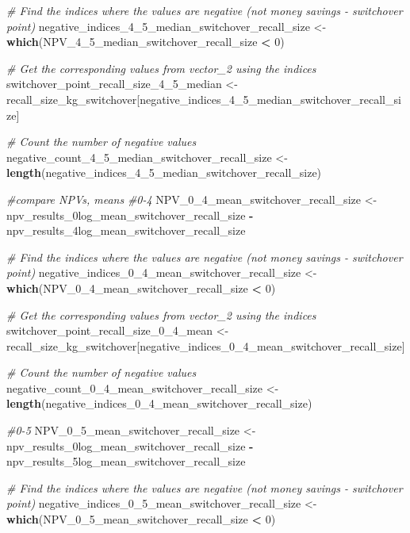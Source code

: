 \documentclass[
]{article}
\newenvironment{Shaded}{\begin{snugshade}}{\end{snugshade}}
\newcommand{\CommentTok}[1]{\textcolor[rgb]{0.56,0.35,0.01}{\textit{#1}}}
\newcommand{\DecValTok}[1]{\textcolor[rgb]{0.00,0.00,0.81}{#1}}
\newcommand{\FunctionTok}[1]{\textcolor[rgb]{0.13,0.29,0.53}{\textbf{#1}}}
\newcommand{\NormalTok}[1]{#1}
\newcommand{\OtherTok}[1]{\textcolor[rgb]{0.56,0.35,0.01}{#1}}
\newcommand{\SpecialCharTok}[1]{\textcolor[rgb]{0.81,0.36,0.00}{\textbf{#1}}}
\begin{document}
\begin{Shaded}
\begin{Highlighting}[]
\CommentTok{\# Find the indices where the values are negative (not money savings {-} switchover point)}
\NormalTok{negative\_indices\_4\_5\_median\_switchover\_recall\_size }\OtherTok{\textless{}{-}} \FunctionTok{which}\NormalTok{(NPV\_4\_5\_median\_switchover\_recall\_size }\SpecialCharTok{\textless{}} \DecValTok{0}\NormalTok{)}

\CommentTok{\# Get the corresponding values from vector\_2 using the indices}
\NormalTok{switchover\_point\_recall\_size\_4\_5\_median }\OtherTok{\textless{}{-}}\NormalTok{ recall\_size\_kg\_switchover[negative\_indices\_4\_5\_median\_switchover\_recall\_size]}

\CommentTok{\# Count the number of negative values}
\NormalTok{negative\_count\_4\_5\_median\_switchover\_recall\_size }\OtherTok{\textless{}{-}} \FunctionTok{length}\NormalTok{(negative\_indices\_4\_5\_median\_switchover\_recall\_size)}


\CommentTok{\#compare NPVs, means}
\CommentTok{\#0{-}4}
\NormalTok{NPV\_0\_4\_mean\_switchover\_recall\_size }\OtherTok{\textless{}{-}}\NormalTok{ npv\_results\_0log\_mean\_switchover\_recall\_size }\SpecialCharTok{{-}}\NormalTok{ npv\_results\_4log\_mean\_switchover\_recall\_size}

\CommentTok{\# Find the indices where the values are negative (not money savings {-} switchover point)}
\NormalTok{negative\_indices\_0\_4\_mean\_switchover\_recall\_size }\OtherTok{\textless{}{-}} \FunctionTok{which}\NormalTok{(NPV\_0\_4\_mean\_switchover\_recall\_size }\SpecialCharTok{\textless{}} \DecValTok{0}\NormalTok{)}

\CommentTok{\# Get the corresponding values from vector\_2 using the indices}
\NormalTok{switchover\_point\_recall\_size\_0\_4\_mean }\OtherTok{\textless{}{-}}\NormalTok{ recall\_size\_kg\_switchover[negative\_indices\_0\_4\_mean\_switchover\_recall\_size]}

\CommentTok{\# Count the number of negative values}
\NormalTok{negative\_count\_0\_4\_mean\_switchover\_recall\_size }\OtherTok{\textless{}{-}} \FunctionTok{length}\NormalTok{(negative\_indices\_0\_4\_mean\_switchover\_recall\_size)}


\CommentTok{\#0{-}5}
\NormalTok{NPV\_0\_5\_mean\_switchover\_recall\_size }\OtherTok{\textless{}{-}}\NormalTok{ npv\_results\_0log\_mean\_switchover\_recall\_size }\SpecialCharTok{{-}}\NormalTok{ npv\_results\_5log\_mean\_switchover\_recall\_size}

\CommentTok{\# Find the indices where the values are negative (not money savings {-} switchover point)}
\NormalTok{negative\_indices\_0\_5\_mean\_switchover\_recall\_size }\OtherTok{\textless{}{-}} \FunctionTok{which}\NormalTok{(NPV\_0\_5\_mean\_switchover\_recall\_size }\SpecialCharTok{\textless{}} \DecValTok{0}\NormalTok{)}


\end{Highlighting}
\end{Shaded}
\end{document}
